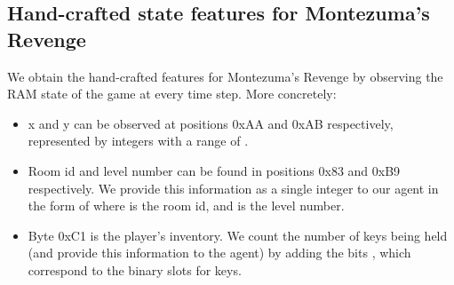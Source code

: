 \documentclass{article} \usepackage{iclr2020_conference,times}
\begin{document}
\subsection{Hand-crafted state features for Montezuma's Revenge}
\label{app:handcrafter}
We obtain the hand-crafted features for Montezuma's Revenge by observing the RAM state of the game at every time step. More concretely:

\begin{itemize}
    \item x and y can be observed at positions 0xAA and 0xAB respectively, represented by integers with a range of .
    \item Room id and level number can be found in positions 0x83 and 0xB9 respectively. We provide this information as a single integer to our agent in the form of  where  is the room id, and  is the level number.
    \item Byte 0xC1 is the player's inventory. We count the number of keys being held (and provide this information to the agent) by adding the bits , which correspond to the binary slots for keys.
\end{itemize}
\end{document}
